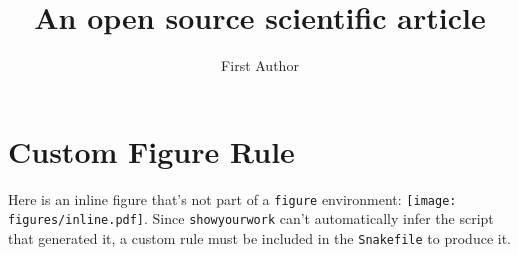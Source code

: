 \documentclass[twocolumn]{aastex631}
\begin{document}
\title{An open source scientific article}

\author{First Author}

\begin{abstract}
    \blindtext
\end{abstract}

\section{Custom Figure Rule}
Here is an inline figure that's not part of a \verb+figure+ environment: \texttt{[image: figures/inline.pdf]}. 
Since \texttt{showyourwork} can't automatically infer the script that generated it, a custom rule must be included in the \texttt{Snakefile} to produce it.
\end{document}
